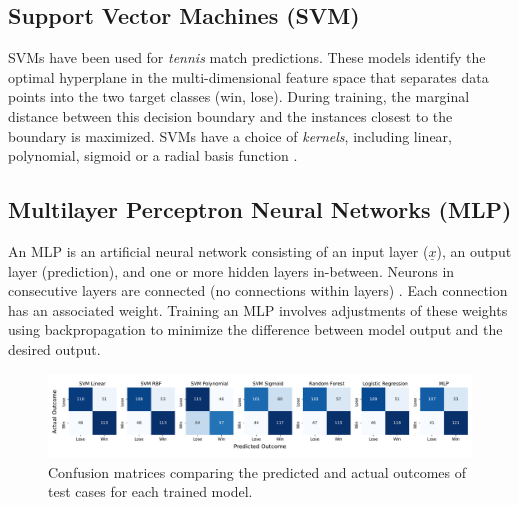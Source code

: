 \subsection{Support Vector Machines (SVM)}
SVMs have been used for  \textit{tennis} match predictions.
These models identify the optimal hyperplane in the multi-dimensional feature space that separates data points into the two target classes (win, lose). During training, the marginal distance between this decision boundary and the instances closest to the boundary is maximized. %
SVMs have a choice of \textit{kernels}, including linear, polynomial, sigmoid or a radial basis function
 \cite{cornman2017machine}.

\subsection{Multilayer Perceptron Neural Networks (MLP)}
An MLP is an artificial neural network consisting of an input layer ($\underline{x}$), an output layer (prediction), and  one or more hidden layers in-between. Neurons in consecutive layers are connected (no connections within layers) \cite{noriega2005multilayer}. Each connection has an associated weight. Training an MLP involves adjustments of these weights using backpropagation to minimize the difference between model output and the desired output.

\begin{figure}[h]
\centering
\includegraphics[width=18cm]{plots/chiang6.pdf}
\vspace{-1em}
\caption{Confusion matrices comparing the predicted and actual outcomes of test cases for each trained model.}

\label{fig:confusionmatrices}
\vspace{-0.2cm}
\centering
\end{figure}
